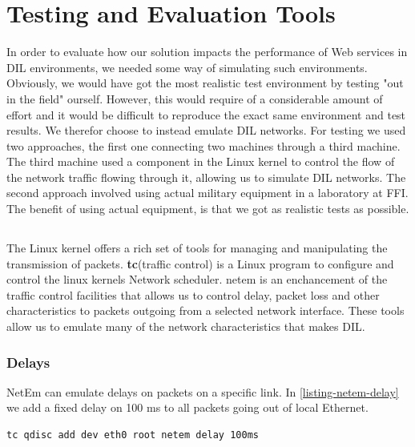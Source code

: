 \section{Testing and Evaluation Tools}

In order to evaluate how our solution impacts the performance of Web services in
DIL environments, we needed some way of simulating such environments. Obviously,
we would have got the most realistic test environment by testing "out in the
field" ourself. However, this would require of a considerable amount of effort
and it would be difficult to reproduce the exact same environment and test
results. We therefor choose to instead emulate DIL networks. For testing we used
two approaches, the first one connecting two machines through a third machine.
The third machine used a component in the Linux kernel to control the flow
of the network traffic flowing through it, allowing us to simulate DIL networks.
The second approach involved using actual military equipment in a laboratory at
FFI. The benefit of using actual equipment, is that we got as realistic tests as
possible.


\subsection{}

The Linux kernel offers a rich set of tools for managing and manipulating the
transmission of packets. \textbf{tc}(traffic control) is a Linux program to
configure and control the linux kernels Network scheduler. \gls{netem} is an
enchancement of the traffic control facilities that allows us to control delay,
packet loss and other characteristics to packets outgoing from a selected
network interface\cite{man-netem}. These tools allow us to emulate many of the network
characteristics that makes DIL.


\subsubsection{Delays}

NetEm can emulate delays on packets on a specific link. In
\cref{listing-netem-delay} we add a fixed delay on 100 ms to all packets going
out of local Ethernet.

\begin{lstlisting}[frame=single, caption="Emulating delay", label=listing-netem-delay]
  tc qdisc add dev eth0 root netem delay 100ms
\end{lstlisting}

